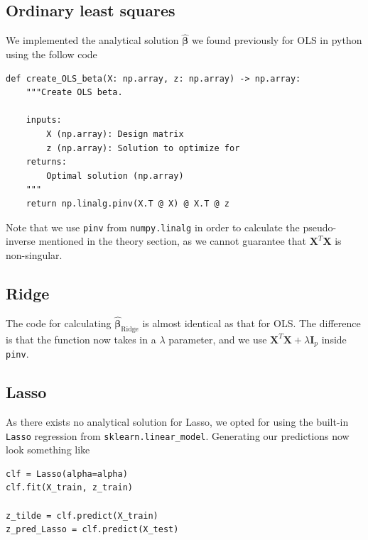 \documentclass{article}
\begin{document}
\subsection{Ordinary least squares}
We implemented the analytical solution $\boldsymbol{\hat{\beta}}$ we found previously for OLS in python using the follow code
\begin{verbatim}
def create_OLS_beta(X: np.array, z: np.array) -> np.array:
    """Create OLS beta.

    inputs:
        X (np.array): Design matrix
        z (np.array): Solution to optimize for
    returns:
        Optimal solution (np.array)
    """
    return np.linalg.pinv(X.T @ X) @ X.T @ z
\end{verbatim}

Note that we use \verb|pinv| from \verb|numpy.linalg| in order to calculate the pseudo-inverse mentioned in the theory section, as we cannot guarantee that $\boldsymbol{X}^T \boldsymbol{X}$ is non-singular.

\subsection{Ridge}
The code for calculating $\boldsymbol{\hat{\beta}}_\text{Ridge}$ is almost identical as that for OLS. The difference is that the function now takes in a $\lambda$ parameter, and we use $\boldsymbol{X}^T \boldsymbol{X} + \lambda \boldsymbol{I}_p$ inside \verb|pinv|.

\subsection{Lasso}
As there exists no analytical solution for Lasso, we opted for using the built-in \verb|Lasso| regression from \verb|sklearn.linear_model|. Generating our predictions now look something like
\begin{verbatim}
clf = Lasso(alpha=alpha)
clf.fit(X_train, z_train)

z_tilde = clf.predict(X_train)
z_pred_Lasso = clf.predict(X_test)
\end{verbatim}

\newpage
\newpage
\end{document}
